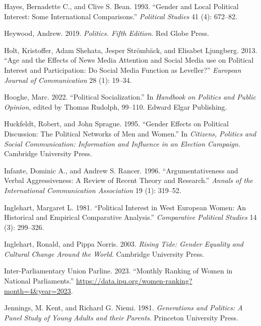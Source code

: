 \documentclass[
  letterpaper,
  DIV=11,
  numbers=noendperiod]{scrreprt}
\newlength{\cslhangindent}
\newlength{\cslentryspacingunit} %
\newenvironment{CSLReferences}[2] %
 {%
  \setlength{\parindent}{0pt}
  \ifodd #1
  \let\oldpar\par
  \def\par{\hangindent=\cslhangindent\oldpar}
  \fi
  \setlength{\parskip}{#2\cslentryspacingunit}
 }%
 {}
\begin{document}
\begin{CSLReferences}{1}{0}
\leavevmode{}%
Hayes, Bernadette C., and Clive S. Bean. 1993. {``{Gender and Local
Political Interest: Some International Comparisons}.''} \emph{Political
Studies} 41 (4): 672--82.

\leavevmode{}%
Heywood, Andrew. 2019. \emph{{Politics. Fifth Edition}}. Red Globe
Press.

\leavevmode{}%
Holt, Kristoffer, Adam Shehata, Jesper Strömbäck, and Elisabet
Ljungberg. 2013. {``{Age and the Effects of News Media Attention and
Social Media use on Political Interest and Participation: Do Social
Media Function as Leveller?}''} \emph{European Journal of Communication}
28 (1): 19--34.

\leavevmode{}%
Hooghe, Marc. 2022. {``{Political Socialization}.''} In \emph{Handbook
on Politics and Public Opinion}, edited by Thomas Rudolph, 99--110.
Edward Elgar Publishing.

\leavevmode{}%
Huckfeldt, Robert, and John Sprague. 1995. {``{Gender Effects on
Political Discussion: The Political Networks of Men and Women}.''} In
\emph{{Citizens, Politics and Social Communication: Information and
Influence in an Election Campaign}}. Cambridge University Press.

\leavevmode{}%
Infante, Dominic A., and Andrew S. Rancer. 1996. {``{Argumentativeness
and Verbal Aggressiveness: A Review of Recent Theory and Research}.''}
\emph{Annals of the International Communication Association} 19 (1):
319--52.

\leavevmode{}%
Inglehart, Margaret L. 1981. {``{Political Interest in West European
Women: An Historical and Empirical Comparative Analysis}.''}
\emph{Comparative Political Studies} 14 (3): 299--326.

\leavevmode{}%
Inglehart, Ronald, and Pippa Norris. 2003. \emph{{Rising Tide: Gender
Equality and Cultural Change Around the World}}. Cambridge University
Press.

\leavevmode{}%
Inter-Parliamentary Union Parline. 2023. {``{Monthly Ranking of Women in
National Parliaments}.''}
\url{https://data.ipu.org/women-ranking?month=4\&year=2023}.

\leavevmode{}%
Jennings, M. Kent, and Richard G. Niemi. 1981. \emph{{Generations and
Politics: A Panel Study of Young Adults and their Parents}}. Princeton
University Press.


\end{CSLReferences}
\end{document}
